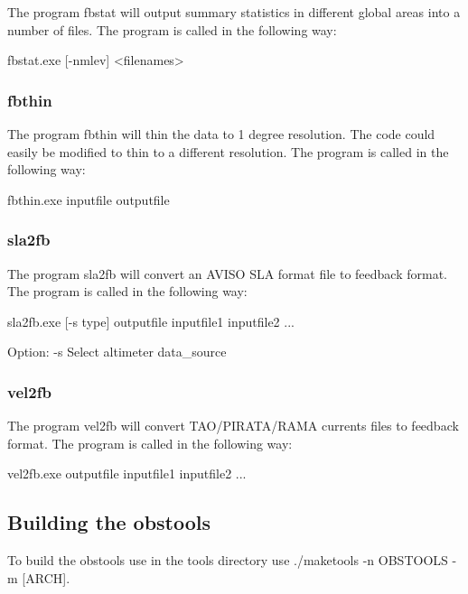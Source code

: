 \documentclass[../tex_main/NEMO_manual]{subfiles}
\begin{document}
The program fbstat will output summary statistics in different global areas into a number of
files. The program is called in the following way:

\footnotesize
\begin{cmds}
fbstat.exe [-nmlev] <filenames>
\end{cmds}

\subsubsection{fbthin}

The program fbthin will thin the data to 1 degree resolution. The code could easily be
modified to thin to a different resolution. The program is called in the following way:

\footnotesize
\begin{cmds}
fbthin.exe inputfile outputfile
\end{cmds}

\subsubsection{sla2fb}

The program sla2fb will convert an AVISO SLA format file to feedback format. The program is
called in the following way:

\footnotesize
\begin{cmds}
sla2fb.exe [-s type] outputfile inputfile1 inputfile2 ...

Option:
     -s            Select altimeter data_source
\end{cmds}

\subsubsection{vel2fb}

The program vel2fb will convert TAO/PIRATA/RAMA currents files to feedback format. The program
is called in the following way:

\footnotesize
\begin{cmds}
vel2fb.exe outputfile inputfile1 inputfile2 ...
\end{cmds}

\subsection{Building the obstools}

To build the obstools use in the tools directory use ./maketools -n OBSTOOLS -m [ARCH].
\end{document}
